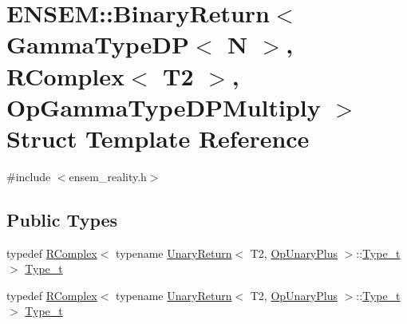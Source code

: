 \hypertarget{structENSEM_1_1BinaryReturn_3_01GammaTypeDP_3_01N_01_4_00_01RComplex_3_01T2_01_4_00_01OpGammaTypeDPMultiply_01_4}{}\section{E\+N\+S\+EM\+:\+:Binary\+Return$<$ Gamma\+Type\+DP$<$ N $>$, R\+Complex$<$ T2 $>$, Op\+Gamma\+Type\+D\+P\+Multiply $>$ Struct Template Reference}
\label{structENSEM_1_1BinaryReturn_3_01GammaTypeDP_3_01N_01_4_00_01RComplex_3_01T2_01_4_00_01OpGammaTypeDPMultiply_01_4}


{\ttfamily \#include $<$ensem\+\_\+reality.\+h$>$}

\subsection*{Public Types}
\begin{DoxyCompactItemize}
\item 
typedef \mbox{\hyperlink{classENSEM_1_1RComplex}{R\+Complex}}$<$ typename \mbox{\hyperlink{structENSEM_1_1UnaryReturn}{Unary\+Return}}$<$ T2, \mbox{\hyperlink{structENSEM_1_1OpUnaryPlus}{Op\+Unary\+Plus}} $>$\+::\mbox{\hyperlink{structENSEM_1_1BinaryReturn_3_01GammaTypeDP_3_01N_01_4_00_01RComplex_3_01T2_01_4_00_01OpGammaTypeDPMultiply_01_4_a7e6760cdc5301aa79d46345dc1f653fe}{Type\+\_\+t}} $>$ \mbox{\hyperlink{structENSEM_1_1BinaryReturn_3_01GammaTypeDP_3_01N_01_4_00_01RComplex_3_01T2_01_4_00_01OpGammaTypeDPMultiply_01_4_a7e6760cdc5301aa79d46345dc1f653fe}{Type\+\_\+t}}
\item 
typedef \mbox{\hyperlink{classENSEM_1_1RComplex}{R\+Complex}}$<$ typename \mbox{\hyperlink{structENSEM_1_1UnaryReturn}{Unary\+Return}}$<$ T2, \mbox{\hyperlink{structENSEM_1_1OpUnaryPlus}{Op\+Unary\+Plus}} $>$\+::\mbox{\hyperlink{structENSEM_1_1BinaryReturn_3_01GammaTypeDP_3_01N_01_4_00_01RComplex_3_01T2_01_4_00_01OpGammaTypeDPMultiply_01_4_a7e6760cdc5301aa79d46345dc1f653fe}{Type\+\_\+t}} $>$ \mbox{\hyperlink{structENSEM_1_1BinaryReturn_3_01GammaTypeDP_3_01N_01_4_00_01RComplex_3_01T2_01_4_00_01OpGammaTypeDPMultiply_01_4_a7e6760cdc5301aa79d46345dc1f653fe}{Type\+\_\+t}}
\end{DoxyCompactItemize}


